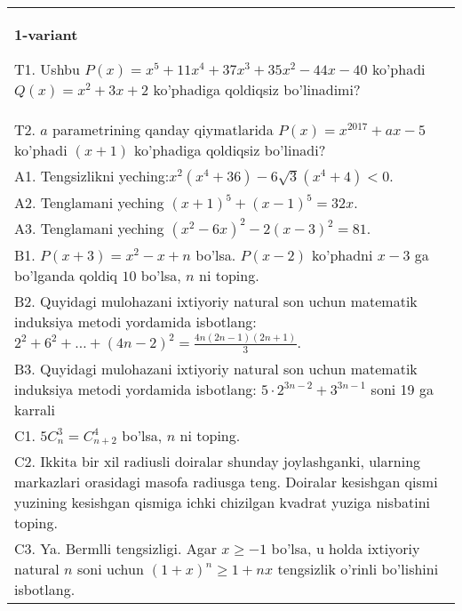 \documentclass{article}
\begin{document}


\begin{tabular}{m{17cm}}
\textbf{1-variant}
\newline

T1. Ushbu \(P(x) = x^{5} + 11x^{4} + 37x^{3} + 35x^{2} - 44x - 40\) ko'phadi \(Q(x) = x^{2} + 3x + 2\) ko'phadiga qoldiqsiz bo'linadimi? \\
T2. \(a\) parametrining qanday qiymatlarida \(P(x) = x^{2017} + ax - 5\) ko'phadi \((x + 1)\) ko'phadiga qoldiqsiz bo'linadi? \\
A1. Tengsizlikni yeching:\(x^{2}\left( x^{4} + 36 \right) - 6\sqrt{3}\left( x^{4} + 4 \right) < 0\). \\
A2. Tenglamani yeching \((x + 1)^{5} + (x - 1)^{5} = 32x\). \\
A3. Tenglamani yeching \(\left( x^{2} - 6x \right)^{2} - 2(x - 3)^{2} = 81\). \\
B1. \(P(x + 3) = x^{2} - x + n\) bo'lsa. \(P(x - 2)\) ko'phadni \(x - 3\) ga bo'lganda qoldiq \(10\) bo'lsa, \(n\) ni toping. \\
B2. Quyidagi mulohazani ixtiyoriy natural son uchun matematik induksiya metodi yordamida isbotlang: \(2^{2} + 6^{2} + \ldots + (4n - 2)^{2} = \frac{4n(2n - 1)(2n + 1)}{3}\). \\
B3. Quyidagi mulohazani ixtiyoriy natural son uchun matematik induksiya metodi yordamida isbotlang: \(5 \cdot 2^{3n - 2} + 3^{3n - 1}\) soni 19 ga karrali \\
C1. \(5C_{n}^{3} = C_{n + 2}^{4}\) bo'lsa, \(n\) ni toping. \\
C2. Ikkita bir xil radiusli doiralar shunday joylashganki, ularning markazlari orasidagi masofa radiusga teng. Doiralar kesishgan qismi yuzining kesishgan qismiga ichki chizilgan kvadrat yuziga nisbatini toping. \\
C3. Ya. Bermlli tengsizligi. Agar \(x \geq - 1\) bo'lsa, u holda ixtiyoriy natural \(n\) soni uchun \((1 + x)^{n} \geq 1 + nx\) tengsizlik o'rinli bo'lishini isbotlang. \\

\end{tabular}
\vspace{1cm}
\end{document}
